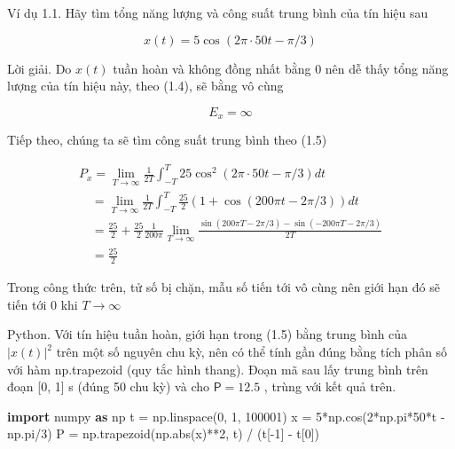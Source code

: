 \documentclass[
  10
]{article}
\newenvironment{Shaded}{}{}
\newcommand{\BuiltInTok}[1]{\textcolor[rgb]{0.00,0.50,0.00}{#1}}
\newcommand{\DecValTok}[1]{\textcolor[rgb]{0.25,0.63,0.44}{#1}}
\newcommand{\ImportTok}[1]{\textcolor[rgb]{0.00,0.50,0.00}{\textbf{#1}}}
\newcommand{\NormalTok}[1]{#1}
\newcommand{\OperatorTok}[1]{\textcolor[rgb]{0.40,0.40,0.40}{#1}}
\begin{document}
Ví dụ 1.1. Hãy tìm tổng năng lượng và công suất trung bình của tín hiệu
sau

\[
x (t) = 5 \cos (2 \pi \cdot 5 0 t - \pi / 3)
\]

Lời giải. Do \(x ( t )\) tuần hoàn và không đồng nhất bằng 0 nên dễ thấy
tổng năng lượng của tín hiệu này, theo (1.4), sẽ bằng vô cùng

\[
E _ {x} = \infty
\]

Tiếp theo, chúng ta sẽ tìm công suất trung bình theo (1.5)

\[
\begin{array}{l} P _ {x} = \lim _ {T \to \infty} \frac {1}{2 T} \int_ {- T} ^ {T} 2 5 \cos^ {2} (2 \pi \cdot 5 0 t - \pi / 3) d t \\ \quad = \lim _ {T \to \infty} \frac {1}{2 T} \int_ {- T} ^ {T} \frac {2 5}{2} (1 + \cos (2 0 0 \pi t - 2 \pi / 3)) d t \\ \quad = \frac {2 5}{2} + \frac {2 5}{2} \frac {1}{2 0 0 \pi} \lim _ {T \to \infty} \frac {\sin (2 0 0 \pi T - 2 \pi / 3) - \sin (- 2 0 0 \pi T - 2 \pi / 3)}{2 T} \\ \quad = \frac {2 5}{2} \end{array}
\]

Trong công thức trên, tử số bị chặn, mẫu số tiến tới vô cùng nên giới
hạn đó sẽ tiến tới 0 khi \(T \to \infty\) 

Python. Với tín hiệu tuần hoàn, giới hạn trong (1.5) bằng trung bình của
\(| x ( t ) | ^ { 2 }\) trên một số nguyên chu kỳ, nên có thể tính gần
đúng bằng tích phân số với hàm np.trapezoid (quy tắc hình thang). Đoạn
mã sau lấy trung bình trên đoạn {[}0, 1{]} s (đúng 50 chu kỳ) và cho
\(\mathsf { P } = 1 2 . 5\) , trùng với kết quả trên.

\begin{Shaded}
\begin{Highlighting}[]
\ImportTok{import}\NormalTok{ numpy }\ImportTok{as}\NormalTok{ np}
\NormalTok{t }\OperatorTok{=}\NormalTok{ np.linspace(}\DecValTok{0}\NormalTok{, }\DecValTok{1}\NormalTok{, }\DecValTok{100001}\NormalTok{)}
\NormalTok{x }\OperatorTok{=} \DecValTok{5}\OperatorTok{*}\NormalTok{np.cos(}\DecValTok{2}\OperatorTok{*}\NormalTok{np.pi}\OperatorTok{*}\DecValTok{50}\OperatorTok{*}\NormalTok{t }\OperatorTok{{-}}\NormalTok{ np.pi}\OperatorTok{/}\DecValTok{3}\NormalTok{)}
\NormalTok{P }\OperatorTok{=}\NormalTok{ np.trapezoid(np.}\BuiltInTok{abs}\NormalTok{(x)}\OperatorTok{**}\DecValTok{2}\NormalTok{, t) }\OperatorTok{/}\NormalTok{ (t[}\OperatorTok{{-}}\DecValTok{1}\NormalTok{] }\OperatorTok{{-}}\NormalTok{ t[}\DecValTok{0}\NormalTok{]) }
\end{Highlighting}
\end{Shaded}
\end{document}
